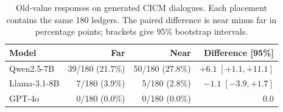 \begin{table}[htbp]
\centering
\small
\setlength{\tabcolsep}{5pt}
\caption{Old-value responses on generated CICM dialogues. Each placement
contains the same 180 ledgers. The paired difference is near minus far in
percentage points; brackets give 95\% bootstrap intervals.}
\label{tab:cicm-diversity}
\begin{tabular}{@{}lrrr@{}}
\toprule
Model & Far & Near & Difference [95\%] \\
\midrule
Qwen2.5-7B & 39/180 (21.7\%) & 50/180 (27.8\%) & $+6.1\;[+1.1,+11.1]$ \\
Llama-3.1-8B & 7/180 (3.9\%) & 5/180 (2.8\%) & $-1.1\;[-3.9,+1.7]$ \\
GPT-4o & 0/180 (0.0\%) & 0/180 (0.0\%) & $0.0$ \\
\bottomrule
\end{tabular}
\end{table}
